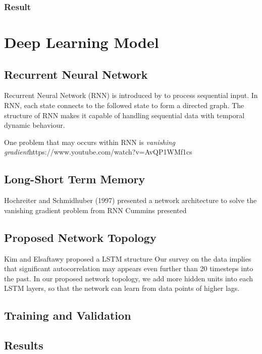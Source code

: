\documentclass[12pt]{article}
\begin{document}
\subsubsection{Result}


\section{Deep Learning Model}
\subsection{Recurrent Neural Network}
Recurrent Neural Network (RNN) is introduced by \cite{rumelhart1988learning} to
process sequential input. In RNN, each state connects to the followed state to form a directed
graph. The structure of RNN makes it capable of handling sequential data with
temporal dynamic behaviour.

One problem that may occurs within RNN is \textit{vanishing gradient}https://www.youtube.com/watch?v=AvQP1WMf1cs
\cite{hochreiter2001gradient}

\subsection{Long-Short Term Memory}
Hochreiter and Schmidhuber (1997) \cite{gers1999learning} presented a network
architecture to solve the vanishing gradient problem from RNN
Cummins presented 

\subsection{Proposed Network Topology}
Kim and Elsaftawy \cite{kimy07lstm} proposed a LSTM structure 
Our survey on the data implies that significant autocorrelation may appears even
further than 20 timesteps into the past. In our proposed network topology, we
add more hidden units into each LSTM layers, so that the network can learn from
data points of higher lags.

\subsection{Training and Validation}

\subsection{Results}
\end{document}
